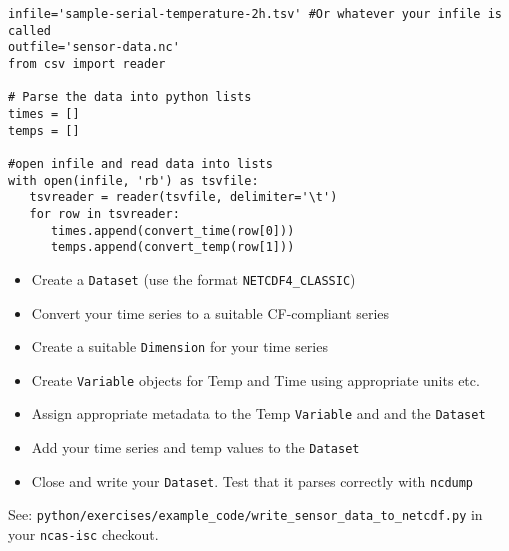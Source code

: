 \documentclass[a4paper,11pt]{article}
\begin{document}
\begin{lrbox}{\csvread}
\begin{minipage}{\textwidth}
\begin{verbatim}
infile='sample-serial-temperature-2h.tsv' #Or whatever your infile is called
outfile='sensor-data.nc'
from csv import reader

# Parse the data into python lists
times = []
temps = []

#open infile and read data into lists
with open(infile, 'rb') as tsvfile:
   tsvreader = reader(tsvfile, delimiter='\t')
   for row in tsvreader:
      times.append(convert_time(row[0]))
      temps.append(convert_temp(row[1]))
\end{verbatim}
\end{minipage}
\end{lrbox}
\begin{solution}
\noindent\usebox\csvread
\end{solution}
\begin{question}
\begin{itemize}
\item
  Create a \texttt{Dataset} (use the format \texttt{NETCDF4\_CLASSIC})
\item
  Convert your time series to a suitable CF-compliant series
\item
  Create a suitable \texttt{Dimension} for your time series
\item
  Create \texttt{Variable} objects for Temp and Time using appropriate
  units etc.
\item
  Assign appropriate metadata to the Temp \texttt{Variable} and and the
  \texttt{Dataset}
\item
  Add your time series and temp values to the \texttt{Dataset}
\item
  Close and write your \texttt{Dataset}. Test that it parses correctly
  with \texttt{ncdump}
\end{itemize}
\end{question}
\begin{solution}
See: \texttt{python/exercises/example\_code/write\_sensor\_data\_to\_netcdf.py} in your \texttt{ncas-isc} checkout.
\end{solution}
\end{document}
